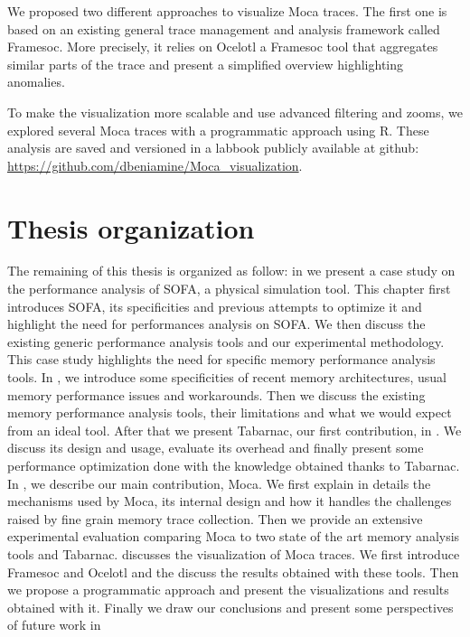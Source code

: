We proposed two different approaches to visualize \gls{Moca} traces.
The first one is based on an existing general trace management and analysis framework called \gls{Framesoc}.
More precisely, it relies on \gls{Ocelotl} a \gls{Framesoc} tool that aggregates similar parts of the trace and present a simplified overview highlighting anomalies.

To make the visualization more scalable and use advanced filtering and zooms, we explored several \gls{Moca} traces with a programmatic approach using \gls{R}.
These analysis are saved and versioned in a labbook publicly available at github: \url{https://github.com/dbeniamine/Moca_visualization}.

\section{Thesis organization}

The remaining of this thesis is organized as follow:
in  we present a case study on the performance analysis of \gls{SOFA}, a physical simulation tool.
This chapter first introduces \gls{SOFA}, its specificities and previous attempts to optimize it and highlight the need for performances analysis on \gls{SOFA}.
We then discuss the existing generic performance analysis tools and our experimental methodology.
This case study highlights the need for specific memory performance analysis tools.
In , we introduce some specificities of recent memory architectures, usual memory performance issues and workarounds.
Then we discuss the existing memory performance analysis tools, their limitations and what we would expect from an ideal tool.
After that we present \gls{Tabarnac}, our first contribution, in .
We discuss its design and usage, evaluate its overhead and finally present some performance optimization done with the knowledge obtained thanks to \gls{Tabarnac}.
In , we describe our main contribution, \gls{Moca}.
We first explain in details the mechanisms used by \gls{Moca}, its internal design and how it handles the challenges raised by fine grain memory trace collection.
Then we provide an extensive experimental evaluation comparing \gls{Moca} to two state of the art memory analysis tools and \gls{Tabarnac}.
 discusses the visualization of \gls{Moca} traces.
We first introduce \gls{Framesoc} and \gls{Ocelotl} and the discuss the results obtained with these tools.
Then we propose a programmatic approach and present the visualizations and results obtained with it.
Finally we draw our conclusions and present some perspectives of future work in 
